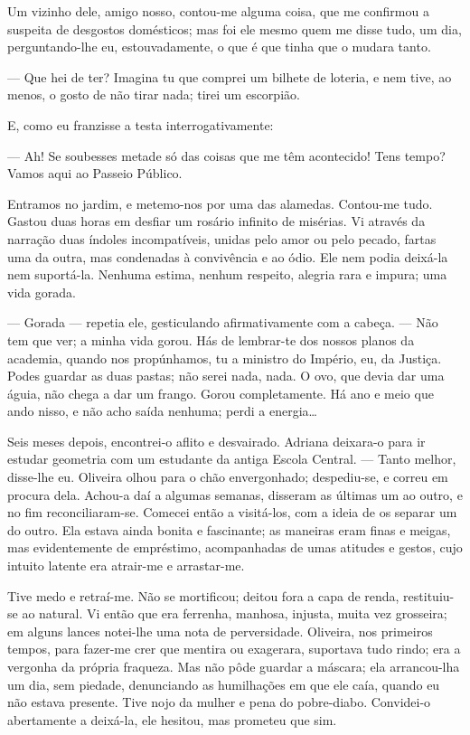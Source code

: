 Um vizinho dele, amigo nosso, contou-me alguma coisa, que me confirmou a
suspeita de desgostos domésticos; mas foi ele mesmo quem me disse tudo,
um dia, perguntando-lhe eu, estouvadamente, o que é que tinha que o
mudara tanto.

--- Que hei de ter? Imagina tu que comprei um bilhete de loteria, e nem
tive, ao menos, o gosto de não tirar nada; tirei um escorpião.

E, como eu franzisse a testa interrogativamente:

--- Ah! Se soubesses metade só das coisas que me têm acontecido! Tens
tempo? Vamos aqui ao Passeio Público.

Entramos no jardim, e metemo-nos por uma das alamedas. Contou-me tudo.
Gastou duas horas em desfiar um rosário infinito de misérias. Vi através
da narração duas índoles incompatíveis, unidas pelo amor ou pelo pecado,
fartas uma da outra, mas condenadas à convivência e ao ódio. Ele nem
podia deixá-la nem suportá-la. Nenhuma estima, nenhum respeito, alegria
rara e impura; uma vida gorada.

--- Gorada --- repetia ele, gesticulando afirmativamente com a cabeça.
--- Não tem que ver; a minha vida gorou. Hás de lembrar-te dos nossos
planos da academia, quando nos propúnhamos, tu a ministro do Império,
eu, da Justiça. Podes guardar as duas pastas; não serei nada, nada. O
ovo, que devia dar uma águia, não chega a dar um frango. Gorou
completamente. Há ano e meio que ando nisso, e não acho saída nenhuma;
perdi a energia\ldots{}

Seis meses depois, encontrei-o aflito e desvairado. Adriana deixara-o
para ir estudar geometria com um estudante da antiga Escola Central. ---
Tanto melhor, disse-lhe eu. Oliveira olhou para o chão envergonhado;
despediu-se, e correu em procura dela. Achou-a daí a algumas semanas,
disseram as últimas um ao outro, e no fim reconciliaram-se. Comecei
então a visitá-los, com a ideia de os separar um do outro. Ela estava
ainda bonita e fascinante; as maneiras eram finas e meigas, mas
evidentemente de empréstimo, acompanhadas de umas atitudes e gestos,
cujo intuito latente era atrair-me e arrastar-me.

Tive medo e retraí-me. Não se mortificou; deitou fora a capa de renda,
restituiu-se ao natural. Vi então que era ferrenha, manhosa, injusta,
muita vez grosseira; em alguns lances notei-lhe uma nota de
perversidade. Oliveira, nos primeiros tempos, para fazer-me crer que
mentira ou exagerara, suportava tudo rindo; era a vergonha da própria
fraqueza. Mas não pôde guardar a máscara; ela arrancou-lha um dia, sem
piedade, denunciando as humilhações em que ele caía, quando eu não
estava presente. Tive nojo da mulher e pena do pobre-diabo. Convidei-o
abertamente a deixá-la, ele hesitou, mas prometeu que sim.

